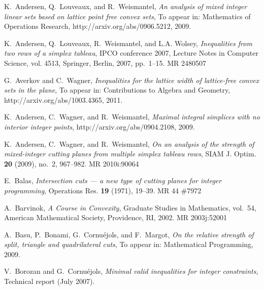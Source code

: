 \documentclass[a4paper]{article}
\theoremstyle{plain}
\begin{document}
\providecommand{\bysame}{\leavevmode\hbox to3em{\hrulefill}\thinspace}
\providecommand{\MR}{\relax\ifhmode\unskip\space\fi MR }
\providecommand{\MRhref}[2]{  \href{http://www.ams.org/mathscinet-getitem?mr=#1}{#2}
}
\providecommand{\href}[2]{#2}
\begin{thebibliography}{ALWW07}

K.~Andersen, Q.~Louveaux, and R.~Weismantel, \emph{An analysis of mixed integer
  linear sets based on lattice point free convex sets}, To appear in:
  Mathematics of Operations Research, http://arxiv.org/abs/0906.5212, 2009.

K.~Andersen, Q.~Louveaux, R.~Weismantel, and L.A. Wolsey, \emph{Inequalities
  from two rows of a simplex tableau}, IPCO conference 2007, Lecture Notes in
  Computer Science, vol. 4513, Springer, Berlin, 2007, pp.~1--15. \MR{2480507}

G.~Averkov and C.~Wagner, \emph{Inequalities for the lattice width of
  lattice-free convex sets in the plane}, To appear in: Contributions to
  Algebra and Geometry, http://arxiv.org/abs/1003.4365, 2011.

K.~Andersen, C.~Wagner, and R.~Weismantel, \emph{Maximal integral simplices
  with no interior integer points}, http://arxiv.org/abs/0904.2108, 2009.

K.~Andersen, C.~Wagner, and R.~Weismantel, \emph{On an analysis of the strength
  of mixed-integer cutting planes from multiple simplex tableau rows}, SIAM J.
  Optim. \textbf{20} (2009), no.~2, 967--982. \MR{2010i:90064}

E.~Balas, \emph{Intersection cuts --- a new type of cutting planes for integer
  programming}, Operations Res. \textbf{19} (1971), 19--39. \MR{44 \#7972}

A.~Barvinok, \emph{A {C}ourse in {C}onvexity}, Graduate Studies in Mathematics,
  vol.~54, American Mathematical Society, Providence, RI, 2002.
  \MR{2003j:52001}

A.~Basu, P.~Bonami, G.~Cornu\'ejols, and F.~Margot, \emph{On the relative
  strength of split, triangle and quadrilateral cuts}, To appear in:
  Mathematical Programming, 2009.

V.~Borozan and G.~Cornu\'ejols, \emph{Minimal valid inequalities for integer
  constraints}, Technical report (July 2007).


\end{thebibliography}
\end{document}
